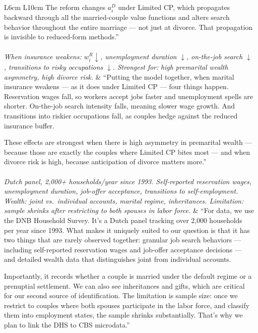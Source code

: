 \documentclass[11pt, a4paper]{article}
\begin{document}
\begin{longtable}{L{6cm} L{10cm}}
The reform changes $a_i^D$ under Limited CP, which propagates backward through all the married-couple value functions and alters search behavior throughout the entire marriage — not just at divorce. That propagation is invisible to reduced-form methods.'' \\[1em]

\\
\textit{When insurance weakens: $w_i^R\downarrow$, unemployment duration $\downarrow$, on-the-job search $\downarrow$, transitions to risky occupations $\downarrow$.
Strongest for: high premarital wealth asymmetry, high divorce risk.} &
``Putting the model together, when marital insurance weakens — as it does under Limited CP — four things happen. Reservation wages fall, so workers accept jobs faster and unemployment spells are shorter. On-the-job search intensity falls, meaning slower wage growth. And transitions into riskier occupations fall, as couples hedge against the reduced insurance buffer.

These effects are strongest when there is high asymmetry in premarital wealth — because those are exactly the couples where Limited CP bites most — and when divorce risk is high, because anticipation of divorce matters more.'' \\[1em]

\\
\textit{Dutch panel, 2,000+ households/year since 1993.
Self-reported reservation wages, unemployment duration, job-offer acceptance, transitions to self-employment.
Wealth: joint vs.\ individual accounts, marital regime, inheritances.
Limitation: sample shrinks after restricting to both spouses in labor force.} &
``For data, we use the DNB Household Survey. It's a Dutch panel tracking over 2,000 households per year since 1993. What makes it uniquely suited to our question is that it has two things that are rarely observed together: granular job search behaviors — including self-reported reservation wages and job-offer acceptance decisions — and detailed wealth data that distinguishes joint from individual accounts.

Importantly, it records whether a couple is married under the default regime or a prenuptial settlement. We can also see inheritances and gifts, which are critical for our second source of identification. The limitation is sample size: once we restrict to couples where both spouses participate in the labor force, and classify them into employment states, the sample shrinks substantially. That's why we plan to link the DHS to CBS microdata.'' \\[1em]


\end{longtable}
\end{document}
